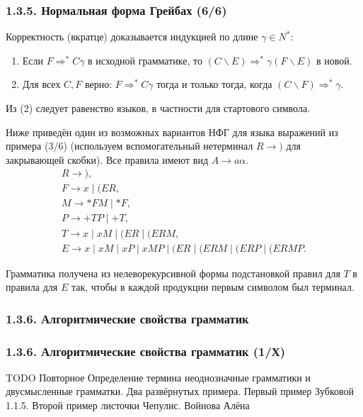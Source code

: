 \documentclass[mathserif,12pt,aspectratio=169]{beamer}
\def\TODO#1{{\color{gray} TODO {#1}}}
\begin{document}
\begin{frame}
\frametitle{1.3.5. Нормальная форма Грейбах (6/6)}
Корректность (вкратце) доказывается индукцией по длине $\gamma\in N^*$:
\begin{enumerate}
\item Если $F\Rightarrow^* C\gamma$ в исходной грамматике, то $(C\backslash E)\Rightarrow^* \gamma(F\backslash E)$ в новой.
\item Для всех $C,F$ верно: $F\Rightarrow^* C\gamma$ тогда и только тогда, когда $(C\backslash F)\Rightarrow^* \gamma$.
\end{enumerate}
Из (2) следует равенство языков, в частности для стартового символа.
\begin{example}
Ниже приведён один из возможных вариантов НФГ для языка выражений из примера (3/6)
(используем вспомогательный нетерминал $R\to )$ для закрывающей скобки).
Все правила имеют вид $A\to a\alpha$.
\small
\[
\begin{array}{l}
R\to ),\\
F\to x \mid (ER,\\
M\to \ast FM \mid \ast F,\\
P\to +TP \mid +T,\\[2mm]
T\to x \mid xM \mid (ER \mid (ERM,\\[2mm]
E\to x \mid xM \mid xP \mid xMP \mid (ER \mid (ERM \mid (ERP \mid (ERMP.
\end{array}
\]
\end{example}

\begin{remark}
Грамматика получена из нелеворекурсивной формы подстановкой правил для $T$ в правила для $E$
так, чтобы в каждой продукции первым символом был терминал.
\end{remark}
\end{frame}




\subsubsection{1.3.6. Алгоритмические свойства грамматик}\label{1.3.6.}
\begin{frame}
\frametitle{1.3.6. Алгоритмические свойства грамматик (1/Х)}

\TODO{Повторное Определение термина неоднозначные грамматики и двусмысленные грамматки.  Два развёрнутых примера. Первый пример Зубковой 1.1.5. Второй пример листочки Чепулис. {\color{blue}  Войнова Алёна}}
\end{frame}
\end{document}
